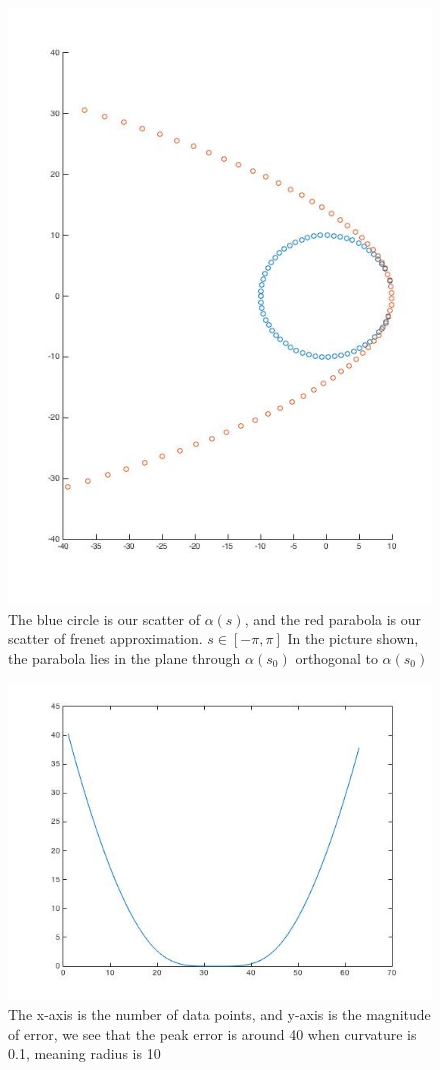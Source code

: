 \documentclass[twoside]{article}
\theoremstyle{definition}
\theoremstyle{definition}
\theoremstyle{remark}
\begin{document}
\begin{figure}[H]
\centering
\includegraphics[width=120mm]{scatter.jpg}
\caption{The blue circle is our scatter of $\alpha(s)$, and the red parabola is our scatter of frenet approximation. $s \in [-\pi, \pi]$ In the picture shown, the parabola lies in the plane through $\alpha(s_0)$ orthogonal to $\alpha(s_0)$}
\end{figure}

\begin{figure}[H]
\centering
\includegraphics[width=120mm]{01.jpg}
\caption{The x-axis is the number of data points, and y-axis is the magnitude of error, we see that the peak error is around 40 when curvature is 0.1, meaning radius is 10}
\end{figure}
\end{document}
